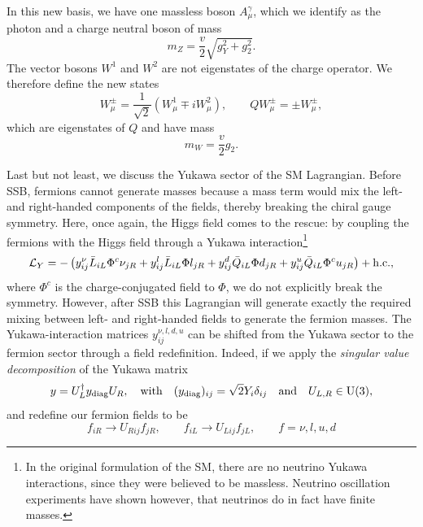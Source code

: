 In this new basis, we have one massless boson $A^\gamma_\mu$, which we identify as the photon and a charge neutral boson of mass
\begin{equation}
m_Z = \frac{v}{2} \sqrt{g_Y^2 + g_2^2}.
\end{equation}
The vector bosons $W^1$ and $W^2$ are not eigenstates of the charge operator. We therefore define the new states
\begin{equation}
W^\pm_\mu = \frac{1}{\sqrt{2}} \left( W^1_\mu \mp i W^2_\mu \right), \qquad Q W_\mu^\pm = \pm W_\mu^\pm,
\end{equation}
which are eigenstates of $Q$ and have mass
\begin{equation}
m_W = \frac{v}{2} g_2.
\end{equation}

Last but not least, we discuss the Yukawa sector of the \acs{SM} Lagrangian. Before \acs{SSB}, fermions cannot generate masses because a mass term would mix the left- and right-handed components of the fields, thereby breaking the chiral gauge symmetry. Here, once again, the Higgs field comes to the rescue: by coupling the fermions with the Higgs field through a Yukawa interaction\footnote{In the original formulation of the \acs{SM}, there are no neutrino Yukawa interactions, since they were believed to be massless. Neutrino oscillation experiments have shown however, that neutrinos do in fact have finite masses.}
\begin{equation}
\mathcal{L}_Y = - \left( y_{ij}^\nu \bar{L}_{iL} \Phi^c \nu_{jR} + y_{ij}^l \bar{L}_{iL} \Phi l_{jR} + y_{ij}^d \bar{Q}_{iL} \Phi d_{jR} + y_{ij}^u \bar{Q}_{iL} \Phi^c u_{jR} \right) + \mathrm{h.c.},
\end{equation}
where $\Phi^c$ is the charge-conjugated field to $\Phi$, we do not explicitly break the symmetry. However, after \acs{SSB} this Lagrangian will generate exactly the required mixing between left- and right-handed fields to generate the fermion masses. The Yukawa-interaction matrices $y_{ij}^{\nu,l, d, u}$ can be shifted from the Yukawa sector to the fermion sector through a field redefinition. Indeed, if we apply the \textit{singular value decomposition} of the Yukawa matrix
\begin{equation}
y = U_L^\dagger y_{\mathrm{diag}} U_R, \quad \text{with} \quad (y_{\mathrm{diag}})_{ij} = \sqrt{2} Y_i \delta_{ij} \quad \text{and} \quad U_{L,R} \in \mathrm{U}(3),
\end{equation}
and redefine our fermion fields to be
\begin{equation}
f_{iR} \longrightarrow U_{Rij} f_{jR}, \qquad f_{iL} \longrightarrow U_{Lij} f_{jL}, \qquad f = \nu, l, u, d
\end{equation}
